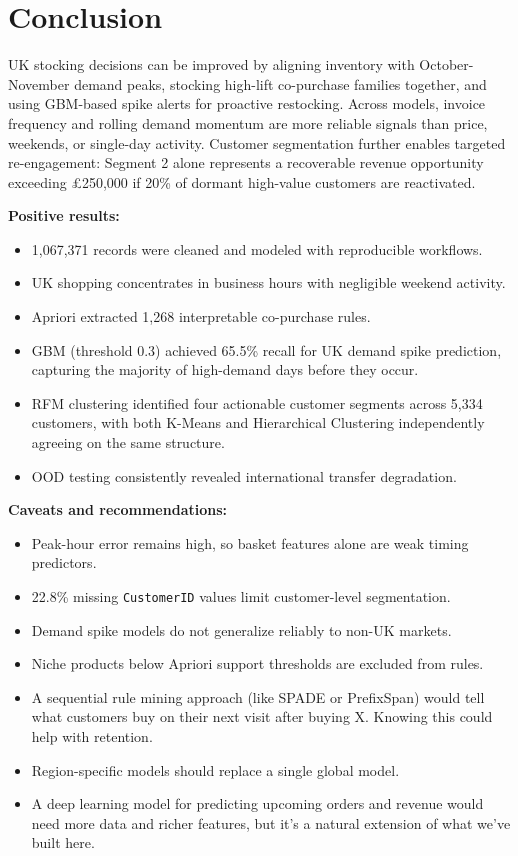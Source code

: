 \documentclass[10pt,a4paper]{article}
\begin{document}
\section{Conclusion}

UK stocking decisions can be improved by aligning inventory with October-November demand peaks, stocking high-lift co-purchase families together, and using GBM-based spike alerts for proactive restocking. Across models, invoice frequency and rolling demand momentum are more reliable signals than price, weekends, or single-day activity. Customer segmentation further enables targeted re-engagement: Segment 2 alone represents a recoverable revenue opportunity exceeding \pounds250,000 if 20\% of dormant high-value customers are reactivated.

\textbf{Positive results:}
\begin{itemize}
  \item 1,067,371 records were cleaned and modeled with reproducible workflows.
  \item UK shopping concentrates in business hours with negligible weekend activity.
  \item Apriori extracted 1,268 interpretable co-purchase rules.
  \item GBM (threshold 0.3) achieved 65.5\% recall for UK demand spike prediction, capturing the majority of high-demand days before they occur.
  \item RFM clustering identified four actionable customer segments across 5,334 customers, with both K-Means and Hierarchical Clustering independently agreeing on the same structure.
  \item OOD testing consistently revealed international transfer degradation.
\end{itemize}

\textbf{Caveats and recommendations:}
\begin{itemize}
  \item Peak-hour error remains high, so basket features alone are weak timing predictors.
  \item 22.8\% missing \texttt{CustomerID} values limit customer-level segmentation.
  \item Demand spike models do not generalize reliably to non-UK markets.
  \item Niche products below Apriori support thresholds are excluded from rules.
  \item A sequential rule mining approach (like SPADE or PrefixSpan) would tell what customers buy on their next visit after buying X. Knowing this could help with retention.
  \item Region-specific models should replace a single global model.
  \item A deep learning model for predicting upcoming orders and revenue would need more data and richer features, but it's a natural extension of what we've built here.
\end{itemize}
\end{document}
